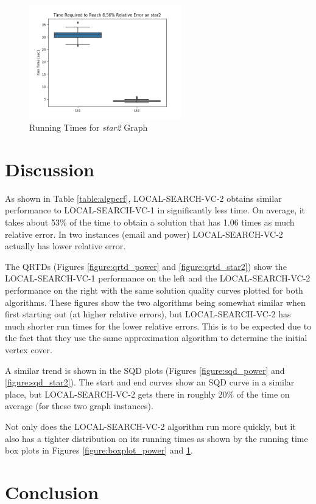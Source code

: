 \documentclass[sigconf]{acmart}
\begin{document}
\begin{figure}[h]
	\centering
	\includegraphics[width=250px]{plots/boxplot_star2.png}
	\caption{Running Times for \textit{star2} Graph}
	\label{figure:boxplot_star2}
\end{figure}

\section{Discussion}
As shown in Table \ref{table:algperf}, LOCAL-SEARCH-VC-2 obtains similar performance to LOCAL-SEARCH-VC-1 in significantly less time. On average, it takes about 53\% of the time to obtain a solution that has 1.06 times as much relative error. In two instances (email and power) LOCAL-SEARCH-VC-2 actually has lower relative error.

The QRTDs (Figures \ref{figure:qrtd_power} and \ref{figure:qrtd_star2}) show the LOCAL-SEARCH-VC-1 performance on the left and the LOCAL-SEARCH-VC-2 performance on the right with the same solution quality curves plotted for both algorithms. These figures show the two algorithms being somewhat similar when first starting out (at higher relative errors), but LOCAL-SEARCH-VC-2 has much shorter run times for the lower relative errors. This is to be expected due to the fact that they use the same approximation algorithm to determine the initial vertex cover.

A similar trend is shown in the SQD plots (Figures \ref{figure:sqd_power} and \ref{figure:sqd_star2}). The start and end curves show an SQD curve in a similar place, but LOCAL-SEARCH-VC-2 gets there in roughly 20\% of the time on average (for these two graph instances).

Not only does the LOCAL-SEARCH-VC-2 algorithm run more quickly, but it also has a tighter distribution on its running times as shown by the running time box plots in Figures \ref{figure:boxplot_power} and \ref{figure:boxplot_star2}.

\section{Conclusion}
\end{document}
